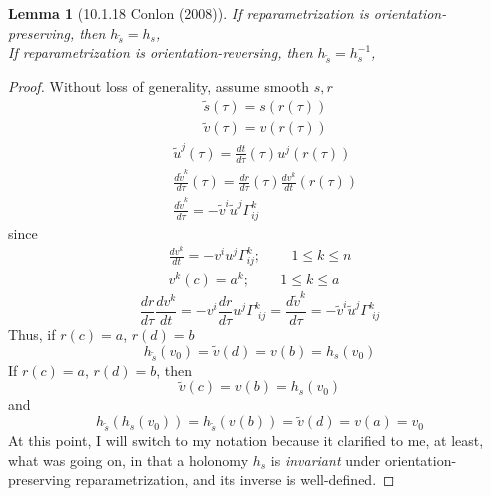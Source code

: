 \documentclass[10pt]{amsart}
\newtheorem{lemma}{Lemma}
\begin{document}
\begin{multicols*}{2}
\begin{lemma}[10.1.18 Conlon (2008)\cite{Conl2008}]
If reparametrization is orientation-preserving, then $h_{\widetilde{s}} = h_s$, \\
If reparametrization is orientation-reversing, then $h_{\widetilde{s}} = h^{-1}_s$, 

\end{lemma}
\begin{proof}
	Without loss of generality,  assume smooth $s,r$
\[
\begin{aligned}
	& \widetilde{s}(\tau) = s(r(\tau)) \\ 
	& \widetilde{v}(\tau) = v(r(\tau))
\end{aligned}
\]
\[
\begin{aligned}
	& \widetilde{u}^j(\tau) = \frac{dt}{d\tau}(\tau) u^j(r(\tau)) \\ 
	& \frac{d\widetilde{v}^k}{d\tau} (\tau) = \frac{dr}{d\tau}(\tau) \frac{dv^k}{dt}(r(\tau)) \\ 
	& \frac{d\widetilde{v}^k }{ d\tau} = -\widetilde{v}^i \widetilde{u}^j \Gamma^k_{ij} 
\end{aligned}
\]
since \[
\begin{gathered}
	\frac{dv^k}{dt} = -v^i u^j \Gamma^k_{ij} ; \qquad \, 1\leq k \leq n \\ 
v^k(c) = a^k; \qquad \, 1\leq k \leq a 
\end{gathered}
\]
\[
\frac{dr}{d\tau} \frac{dv^k}{ dt} = -v^i \frac{dr}{d\tau} u^j \Gamma^k_{ \, \, ij} = \frac{d\widetilde{v}^k}{d\tau} = -\widetilde{v}^i \widetilde{u}^j \Gamma^k_{ \, \, ij}
\]
Thus, if $r(c) = a$, $r(d)=b$
\[
h_{\widetilde{s}}(v_0) = \widetilde{v}(d) = v(b) = h_s(v_0)
\]
If $r(c)=a$, $r(d)=b$, then 
\[
\widetilde{v}(c) = v(b) = h_s(v_0)
\]
and 
\[
h_{\widetilde{s}}(h_s(v_0)) = h_{\widetilde{s}}(v(b)) = \widetilde{v}(d) = v(a) = v_0
\]
At this point, I will switch to my notation because it clarified to me, at least, what was going on, in that a holonomy $h_s$ is \emph{invariant} under orientation-preserving reparametrization, and its inverse is well-defined.  


\end{proof}
\end{multicols*}
\end{document}
